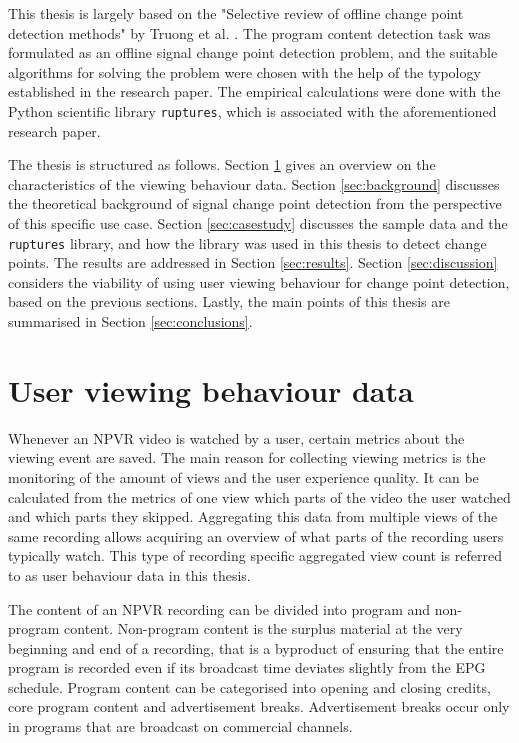 This thesis is largely based on the "Selective review of offline change point detection methods" by Truong et al. \cite{truongSelectiveReviewOffline2020}. The program content detection task was formulated as an offline signal change point detection problem, and the suitable algorithms for solving the problem were chosen with the help of the typology established in the research paper. The empirical calculations were done with the Python scientific library \texttt{ruptures}, which is associated with the aforementioned research paper.

The thesis is structured as follows. Section \ref{sec:data} gives an overview on the characteristics of the viewing behaviour data. Section \ref{sec:background} discusses the theoretical background of signal change point detection from the perspective of this specific use case. Section \ref{sec:casestudy} discusses the sample data and the \texttt{ruptures} library, and how the library was used in this thesis to detect change points. The results are addressed in Section \ref{sec:results}. Section \ref{sec:discussion} considers the viability of using user viewing behaviour for change point detection, based on the previous sections. Lastly, the main points of this thesis are summarised in Section \ref{sec:conclusions}.

\newpage
\section{User viewing behaviour data} \label{sec:data}

Whenever an NPVR video is watched by a user, certain metrics about the viewing event are saved. The main reason for collecting viewing metrics is the monitoring of the amount of views and the user experience quality. It can be calculated from the metrics of one view which parts of the video the user watched and which parts they skipped. Aggregating this data from multiple views of the same recording allows acquiring an overview of what parts of the recording users typically watch. This type of recording specific aggregated view count is referred to as user behaviour data in this thesis.

The content of an NPVR recording can be divided into program and non-program content. Non-program content is the surplus material at the very beginning and end of a recording, that is a byproduct of ensuring that the entire program is recorded even if its broadcast time deviates slightly from the EPG schedule. Program content can be categorised into opening and closing credits, core program content and advertisement breaks. Advertisement breaks occur only in programs that are broadcast on commercial channels.

